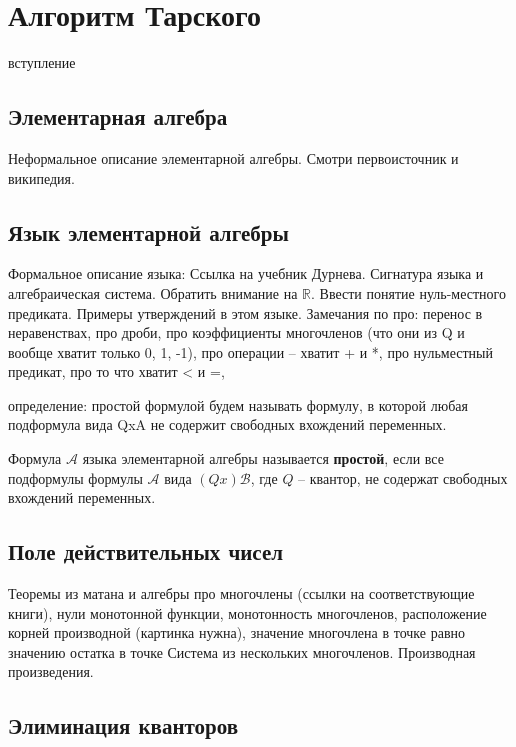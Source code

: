 \section{Алгоритм Тарского}

вступление

\subsection{Элементарная алгебра}

Неформальное описание элементарной алгебры. Смотри первоисточник и википедия.

\subsection{Язык элементарной алгебры}

Формальное описание языка: Ссылка на учебник Дурнева. Сигнатура языка и алгебраическая система. Обратить внимание на $\mathbb{R}$. Ввести понятие нуль-местного предиката. Примеры утверждений в этом языке.
Замечания по про: перенос в неравенствах, про дроби, про коэффициенты многочленов (что они из Q и вообще хватит только 0, 1, -1), про операции -- хватит + и *, про нульместный предикат, про то что хватит < и =, 

определение: простой формулой будем называть формулу, в которой любая подформула вида QxA не содержит свободных вхождений переменных. 
\begin{definition}\label{simpleFormula}
    Формула $\mathcal{A}$ языка элементарной алгебры называется \textbf{простой}, если все подформулы формулы $\mathcal{A}$ вида $(Qx)\mathcal{B}$, где $Q$ -- квантор, не содержат свободных вхождений переменных.
\end{definition}


\subsection{Поле действительных чисел}

Теоремы из матана и алгебры про многочлены (ссылки на соответствующие книги), нули монотонной функции, монотонность многочленов, расположение корней производной (картинка нужна), значение многочлена в точке равно значению остатка в точке
Система из нескольких многочленов. Производная произведения.

\subsection{Элиминация кванторов}

